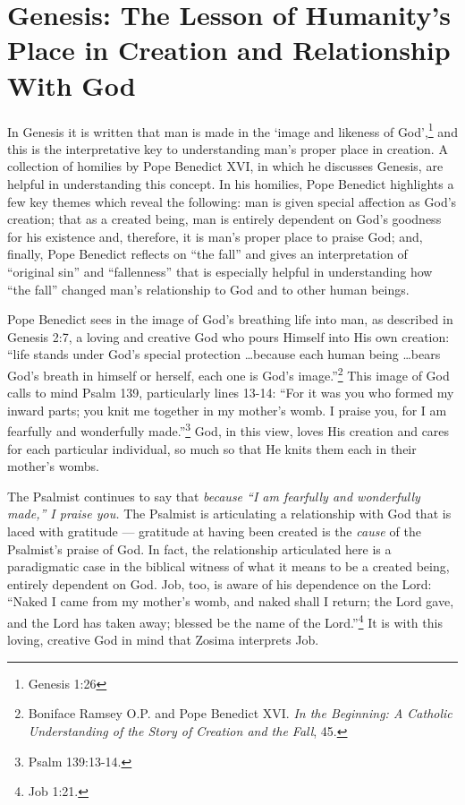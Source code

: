 \section{Genesis: The Lesson of Humanity's Place in Creation and Relationship With God}
In Genesis it is written that man is made in the `image and likeness of God',\footnote{Genesis 1:26} and this is the interpretative key to understanding man's proper place in creation. A collection of homilies by Pope Benedict XVI, in which he discusses Genesis, are helpful in understanding this concept. In his homilies, Pope Benedict highlights a few key themes which reveal the following: man is given special affection as God's creation; that as a created being, man is entirely dependent on God's goodness for his existence and, therefore, it is man's proper place to praise God; and, finally, Pope Benedict reflects on ``the fall'' and gives an interpretation of ``original sin'' and ``fallenness'' that is especially helpful in understanding how ``the fall'' changed man's relationship to God and to other human beings.

Pope Benedict sees in the image of God's breathing life into man, as described in Genesis 2:7, a loving and creative God who pours Himself into His own creation: ``life stands under God's special protection \ldots because each human being \ldots bears God's breath in himself or herself, each one is God's image.''\footnote{Boniface Ramsey O.P. and Pope Benedict XVI. \emph{In the Beginning: A Catholic Understanding of the Story of Creation and the Fall}, 45.} This image of God calls to mind Psalm 139, particularly lines 13-14: ``For it was you who formed my inward parts; you knit me together in my mother's womb. I praise you, for I am fearfully and wonderfully made.''\footnote{Psalm 139:13-14.} God, in this view, loves His creation and cares for each particular individual, so much so that He knits them each in their mother's wombs. 

The Psalmist continues to say that \emph{because ``I am fearfully and wonderfully made,'' I praise you.} The Psalmist is articulating a relationship with God that is laced with gratitude --- gratitude at having been created is the \emph{cause} of the Psalmist's praise of God. In fact, the relationship articulated here is a paradigmatic case in the biblical witness of what it means to be a created being, entirely dependent on God. Job, too, is aware of his dependence on the Lord: ``Naked I came from my mother's womb, and naked shall I return; the Lord gave, and the Lord has taken away; blessed be the name of the Lord.''\footnote{Job 1:21.} It is with this loving, creative God in mind that Zosima interprets Job.

